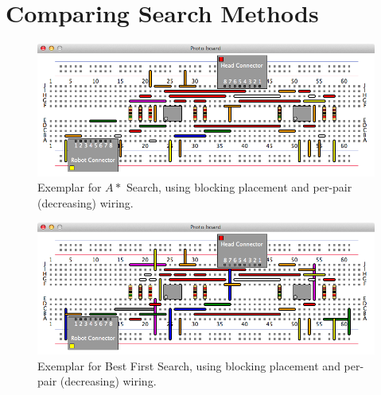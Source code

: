 \section{Comparing Search Methods}

\begin{figure}[H]
\begin{center}
\includegraphics[width=\textwidth]{Images/exemplar_per_pair_decreasing.png}
\caption[$A*$ Search exemplar]{Exemplar for $A*$ Search, using blocking
placement and per-pair (decreasing) wiring.}
\end{center}
\end{figure}

\begin{figure}[H]
\begin{center}
\includegraphics[width=\textwidth]{Images/exemplar_best_first.png}
\caption[Best First Search exemplar]{Exemplar for Best First Search, using
blocking placement and per-pair (decreasing) wiring.}
\end{center}
\end{figure}

